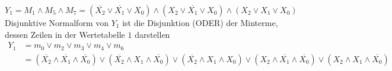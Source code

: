 \documentclass[]{article}
\newcommand{\V}{\lor}
\newcommand{\A}{\land}
\newcommand{\T}[1]{\overline{#1}}
\begin{document}
	$Y_1 = M_1 \A M_5 \A M_7 =
		(\T{X_2} \V \T{X_1} \V 	X_0) \A    %
		(    X_2 \V \T{X_1} \V    X_0) \A  %
		(    X_2 \V     X_1 \V    X_0)$\\    %

	Disjunktive Normalform von $Y_1$ ist die Disjunktion (ODER) der Minterme, dessen Zeilen in der Wertetabelle $1$ darstellen\\

	\begin{align*}
		Y_1 &= m_0 \V m_2 \V m_3 \V m_4 \V m_6\\
		&=
		(\T{X_2} \A \T{X_1} \A \T{X_0}) \V
		(\T{X_2} \A     X_1 \A \T{X_0}) \V
		(\T{X_2} \A     X_1 \A    X_0) \V
		(    X_2 \A \T{X_1} \A \T{X_0}) \V
		(    X_2 \A     X_1 \A \T{X_0})
	\end{align*}
\end{document}
